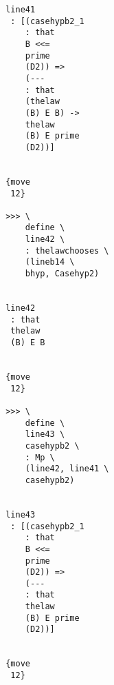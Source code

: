 \documentclass[12pt]{article}
\begin{document}
\begin{verbatim}
                                       line41 
                                        : [(casehypb2_1 
                                           : that 
                                           B <<= 
                                           prime 
                                           (D2)) => 
                                           (--- 
                                           : that 
                                           (thelaw 
                                           (B) E B) -> 
                                           thelaw 
                                           (B) E prime 
                                           (D2))]


                                       {move 
                                        12}

                                       >>> \
                                           define \
                                           line42 \
                                           : thelawchooses \
                                           (lineb14 \
                                           bhyp, Casehyp2)


                                       line42 
                                        : that 
                                        thelaw 
                                        (B) E B


                                       {move 
                                        12}

                                       >>> \
                                           define \
                                           line43 \
                                           casehypb2 \
                                           : Mp \
                                           (line42, line41 \
                                           casehypb2)


                                       line43 
                                        : [(casehypb2_1 
                                           : that 
                                           B <<= 
                                           prime 
                                           (D2)) => 
                                           (--- 
                                           : that 
                                           thelaw 
                                           (B) E prime 
                                           (D2))]


                                       {move 
                                        12}


\end{verbatim}
\end{document}
